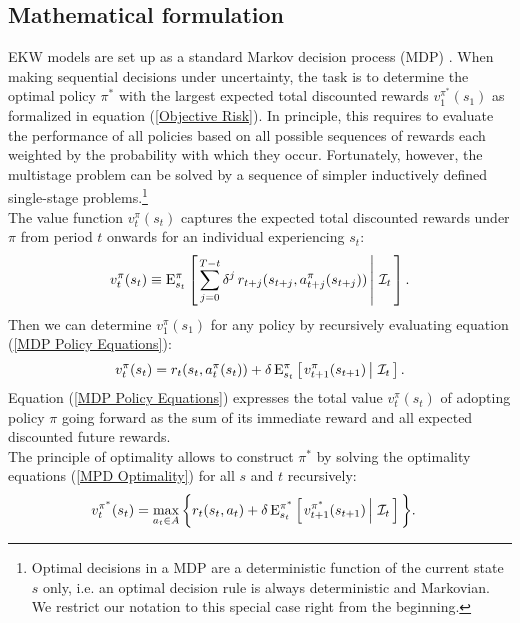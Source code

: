 \subsection{Mathematical formulation}\label{Mathematics}
EKW models are set up as a standard Markov decision process (MDP) \citep{Puterman.1994,White.1993}. When making sequential decisions under uncertainty, the task is to determine the optimal policy $\pi^*$ with the largest expected total discounted rewards $v^{\pi^*}_1(s_1)$ as formalized in equation (\ref{Objective Risk}). In principle, this requires to evaluate the performance of all policies based on all possible sequences of rewards each weighted by the probability with which they occur. Fortunately, however, the multistage problem can be solved by a sequence of simpler inductively defined single-stage problems.\footnote{Optimal decisions in a MDP are a deterministic function of the current state $s$ only, i.e. an optimal decision rule is always deterministic and Markovian. We restrict our notation to this special case right from the beginning.}\\

\noindent The value function $v^\pi_t(s_t)$ captures the expected total discounted rewards under $\pi$ from period $t$ onwards for an individual experiencing $s_t$:
%
\begin{align*}
  v^\pi_t(s_t) \equiv \mathrm{E}_{s_t}^\pi\left[\left.\sum^{T - t}_{j = 0}  \delta^j\, r_{t + j}(s_{t + j}, a^\pi_{t + j}(s_{t + j})) \,\right\vert\,\mathcal{I}_t\,\right].
\end{align*}
%
Then we can determine $v_1^\pi(s_1)$ for any policy by recursively evaluating equation (\ref{MDP Policy Equations}):
%
\begin{align}\label{MDP Policy Equations}
v^\pi_t(s_t) = r_t(s_t,  a^\pi_t(s_t)) + \delta\,\mathrm{E}^\pi_{s_t} \left[\left.v^\pi_{t + 1}(s_{t + 1})  \,\right\vert\,\mathcal{I}_t\,\right].
\end{align}
%
Equation (\ref{MDP Policy Equations}) expresses the total value $v^\pi_t(s_t)$ of adopting policy $\pi$ going forward as the sum of its immediate reward and all expected discounted future rewards.\\

\noindent The principle of optimality \citep{Bellman.1954} allows to construct $\pi^*$ by solving the optimality equations (\ref{MPD Optimality})  for all $s$ and $t$ recursively:
%
\begin{align}\label{MPD Optimality}
v^{\pi^*}_t(s_t)  & = \max_{a_t \in A}\bigg\{ r_t(s_t, a_t) + \delta\, \mathrm{E}^{\pi^*}_{s_t} \left[\left.v^{\pi^*}_{t + 1}(s_{t + 1})\,\right\vert\,\mathcal{I}_t\,\right] \bigg\}.
\end{align}

